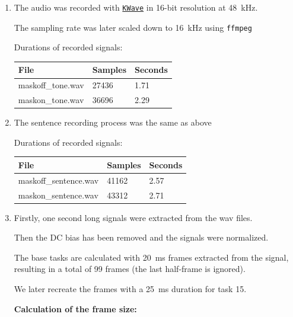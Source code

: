 \documentclass[a4paper, 11pt]{article}
\begin{document}
    \begin{enumerate}
        \item
        The audio was recorded with \texttt{\href{https://apps.kde.org/en/kwave}{KWave}} in 16-bit resolution at 48~kHz.

        The sampling rate was later scaled down to 16~kHz using \texttt{ffmpeg}

        Durations of recorded signals: \\
        \begin{tabular}{ | l | l | l | }
            \hline
            \textbf{File}     & \textbf{Samples} & \textbf{Seconds} \\ \hline
            maskoff\_tone.wav & 27436            & 1.71             \\ \hline
            maskon\_tone.wav  & 36696            & 2.29             \\ \hline
        \end{tabular}

        \item
        The sentence recording process was the same as above

        Durations of recorded signals: \\
        \begin{tabular}{ | l | l | l | }
            \hline
            \textbf{File}         & \textbf{Samples} & \textbf{Seconds} \\ \hline
            maskoff\_sentence.wav & 41162            & 2.57             \\ \hline
            maskon\_sentence.wav  & 43312            & 2.71             \\ \hline
        \end{tabular}

        \newpage
        \item
        Firstly, one second long signals were extracted from the wav files.

        Then the DC bias has been removed and the signals were normalized.

        The base tasks are calculated with 20~ms frames extracted from the signal, resulting in a total of 99 frames
        (the last half-frame is ignored).

        We later recreate the frames with a 25~ms duration for task 15.

        \vspace{2mm}
        \textbf{Calculation of the frame size:}


\end{enumerate}
\end{document}
